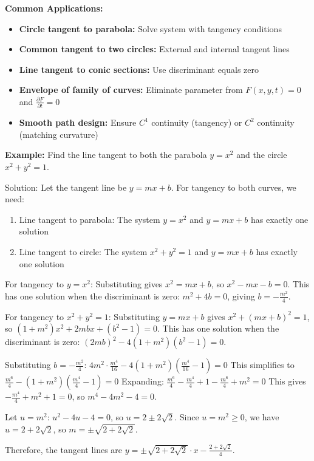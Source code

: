 \documentclass[12pt]{article}
\begin{document}
\textbf{Common Applications:}
\begin{itemize}
    \item \textbf{Circle tangent to parabola:} Solve system with tangency conditions
    \item \textbf{Common tangent to two circles:} External and internal tangent lines
    \item \textbf{Line tangent to conic sections:} Use discriminant equals zero
    \item \textbf{Envelope of family of curves:} Eliminate parameter from $F(x,y,t) = 0$ and $\frac{\partial F}{\partial t} = 0$
    \item \textbf{Smooth path design:} Ensure $C^1$ continuity (tangency) or $C^2$ continuity (matching curvature)
\end{itemize}

\textbf{Example:} Find the line tangent to both the parabola $y = x^2$ and the circle $x^2 + y^2 = 1$.

Solution:
Let the tangent line be $y = mx + b$. For tangency to both curves, we need:
\begin{enumerate}
    \item Line tangent to parabola: The system $y = x^2$ and $y = mx + b$ has exactly one solution
    \item Line tangent to circle: The system $x^2 + y^2 = 1$ and $y = mx + b$ has exactly one solution
\end{enumerate}

For tangency to $y = x^2$: Substituting gives $x^2 = mx + b$, so $x^2 - mx - b = 0$. This has one solution when the discriminant is zero: $m^2 + 4b = 0$, giving $b = -\frac{m^2}{4}$.

For tangency to $x^2 + y^2 = 1$: Substituting $y = mx + b$ gives $x^2 + (mx + b)^2 = 1$, so $(1 + m^2)x^2 + 2mbx + (b^2 - 1) = 0$. This has one solution when the discriminant is zero: $(2mb)^2 - 4(1 + m^2)(b^2 - 1) = 0$.

Substituting $b = -\frac{m^2}{4}$: $4m^2 \cdot \frac{m^4}{16} - 4(1 + m^2)(\frac{m^4}{16} - 1) = 0$
This simplifies to $\frac{m^6}{4} - (1 + m^2)(\frac{m^4}{4} - 1) = 0$
Expanding: $\frac{m^6}{4} - \frac{m^4}{4} + 1 - \frac{m^6}{4} + m^2 = 0$
This gives $-\frac{m^4}{4} + m^2 + 1 = 0$, so $m^4 - 4m^2 - 4 = 0$.

Let $u = m^2$: $u^2 - 4u - 4 = 0$, so $u = 2 \pm 2\sqrt{2}$.
Since $u = m^2 \geq 0$, we have $u = 2 + 2\sqrt{2}$, so $m = \pm\sqrt{2 + 2\sqrt{2}}$.

Therefore, the tangent lines are $y = \pm\sqrt{2 + 2\sqrt{2}} \cdot x - \frac{2 + 2\sqrt{2}}{4}$.
\end{document}
